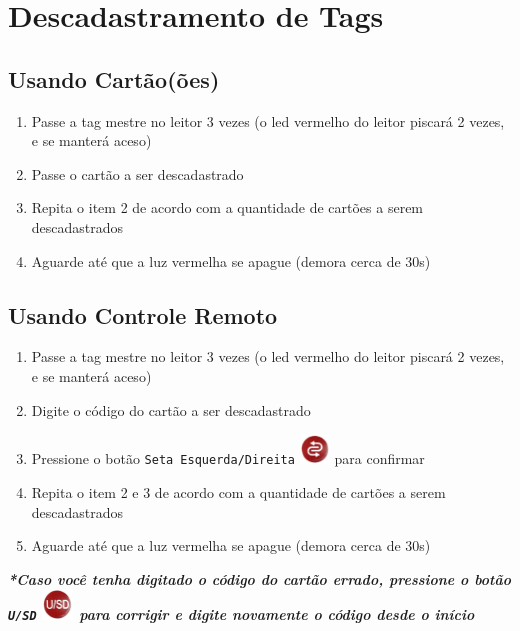 \documentclass[a4paper, 12pt]{article}
\begin{document}
\section{Descadastramento de Tags}

\subsection{Usando Cartão(ões)}

\begin{enumerate}
\item Passe a tag mestre no leitor 3 vezes (o led vermelho do leitor piscará 2 vezes, e se manterá aceso)
\item Passe o cartão a ser descadastrado
\item Repita o item 2 de acordo com a quantidade de cartões a serem descadastrados
\item Aguarde até que a luz vermelha se apague (demora cerca de 30s)
\end{enumerate}

\subsection{Usando Controle Remoto}

\begin{enumerate}
\item Passe a tag mestre no leitor 3 vezes (o led vermelho do leitor piscará 2 vezes, e se manterá aceso)
\item Digite o código do cartão a ser descadastrado
\item Pressione o botão \texttt{Seta Esquerda/Direita} \includegraphics[height=8mm]{ok} para confirmar
\item Repita o item 2 e 3 de acordo com a quantidade de cartões a serem descadastrados
\item Aguarde até que a luz vermelha se apague (demora cerca de 30s)
\end{enumerate}

\textbf{\textit{*Caso você tenha digitado o código do cartão errado, pressione o botão \texttt{U/SD} \includegraphics[height=8mm]{cancel} para corrigir e digite novamente o código desde o início}}
\end{document}
